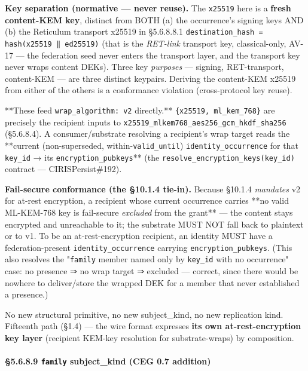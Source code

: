 \documentclass[11pt]{article}
\begin{document}
\textbf{Key separation (normative — never reuse).} The \texttt{x25519} here is a \textbf{fresh content-KEM key}, distinct from BOTH (a) the occurrence's signing keys AND (b) the Reticulum transport x25519 in §5.6.8.8.1 \texttt{destination\_hash = hash(x25519 ‖ ed25519)} (that is the \textit{RET-link} transport key, classical-only, AV-17 — the federation seed never enters the transport layer, and the transport key never wraps content DEKs). Three key \textit{purposes} — signing, RET-transport, content-KEM — are three distinct keypairs. Deriving the content-KEM x25519 from either of the others is a conformance violation (cross-protocol key reuse).


**These feed \texttt{wrap\_algorithm: v2} directly.** \texttt{\{x25519, ml\_kem\_768\}} are precisely the recipient inputs to \texttt{x25519\_mlkem768\_aes256\_gcm\_hkdf\_sha256} (§5.6.8.4). A consumer/substrate resolving a recipient's wrap target reads the **current (non-superseded, within-\texttt{valid\_until}) \texttt{identity\_occurrence} for that \texttt{key\_id} → its \texttt{encryption\_pubkeys}** (the \texttt{resolve\_encryption\_keys(key\_id)} contract — CIRISPersist\#192).


\textbf{Fail-secure conformance (the §10.1.4 tie-in).} Because §10.1.4 \textit{mandates} v2 for at-rest encryption, a recipient whose current occurrence carries **no valid ML-KEM-768 key is fail-secure \textit{excluded} from the grant** — the content stays encrypted and unreachable to it; the substrate MUST NOT fall back to plaintext or to v1. To be an at-rest-encryption recipient, an identity MUST have a federation-present \texttt{identity\_occurrence} carrying \texttt{encryption\_pubkeys}. (This also resolves the "\texttt{family} member named only by \texttt{key\_id} with no occurrence" case: no presence ⇒ no wrap target ⇒ excluded — correct, since there would be nowhere to deliver/store the wrapped DEK for a member that never established a presence.)


No new structural primitive, no new subject\_kind, no new replication kind. Fifteenth path (§1.4) — the wire format expresses \textbf{its own at-rest-encryption key layer} (recipient KEM-key resolution for substrate-wraps) by composition.


\paragraph{§5.6.8.9 \texttt{family} subject\_kind (CEG 0.7 addition)}\mbox{}\\
\end{document}
